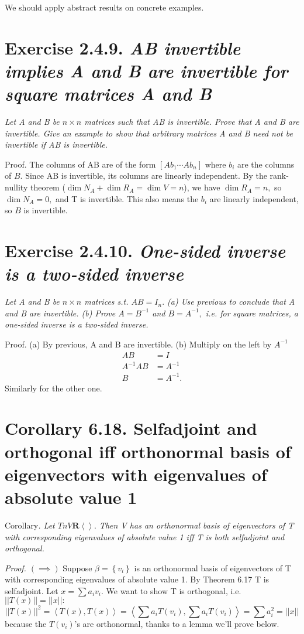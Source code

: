 \documentclass[12pt,english]{article}
\begin{document}
We should apply abstract results on concrete examples.

\section{Exercise 2.4.9.\emph{ AB invertible implies A and B are invertible
for square matrices A and B}}

\emph{Let A and B be $n\times n$ matrices such that AB is invertible.
Prove that A and B are invertible. Give an example to show that arbitrary
matrices A and B need not be invertible if AB is invertible.}

Proof. The columns of AB are of the form $\left[Ab_{1}\cdots Ab_{n}\right]$
where $b_{i}$ are the columns of $B.$ Since AB is invertible, its
columns are linearly independent. By the rank-nullity theorem ($\dim N_{A}+\dim R_{A}=\dim V=n$),
we have $\dim R_{A}=n,$ so $\dim N_{A}=0,$ and T is invertible.
This also means the $b_{i}$ are linearly independent, so $B$ is
invertible.

\section{Exercise 2.4.10. \emph{One-sided inverse is a two-sided inverse}}

\emph{Let A and B be $n\times n$ matrices s.t. $AB=I_{n}.$ (a) Use
previous to conclude that A and B are invertible. (b) Prove $A=B^{-1}$
and $B=A^{-1},$ i.e. for square matrices, a one-sided inverse is
a two-sided inverse.}

Proof. (a) By previous, A and B are invertible. (b) Multiply on the
left by $A^{-1}$
\[
\begin{aligned}AB & =I\\
A^{-1}AB & =A^{-1}\\
B & =A^{-1}.
\end{aligned}
\]
Similarly for the other one.

\section{Corollary 6.18. Selfadjoint and orthogonal iff orthonormal basis
of eigenvectors with eigenvalues of absolute value 1}

Corollary\emph{. Let $TnV\mathbf{R}\left\langle \right\rangle .$
Then V has an orthonormal basis of eigenvectors of T with corresponding
eigenvalues of absolute value 1 iff T is both selfadjoint and orthogonal.}

\emph{Proof. $\left(\implies\right)$ }Suppose $\beta=\left\{ v_{i}\right\} $
is an orthonormal basis of eigenvectors of T with corresponding eigenvalues
of absolute value 1. By Theorem 6.17 T is selfadjoint. Let $x=\sum a_{i}v_{i}.$
We want to show T is orthogonal, i.e. $\left|\left|T(x)\right|\right|=\left|\left|x\right|\right|:$
\[
\left|\left|T(x)\right|\right|^{2}=\left\langle T(x),T(x)\right\rangle =\left\langle \sum a_{i}T(v_{i}),\sum a_{i}T(v_{i})\right\rangle =\sum a_{i}^{2}=\left|\left|x\right|\right|
\]
because the $T(v_{i})$'s are orthonormal, thanks to a lemma we'll
prove below.
\end{document}

